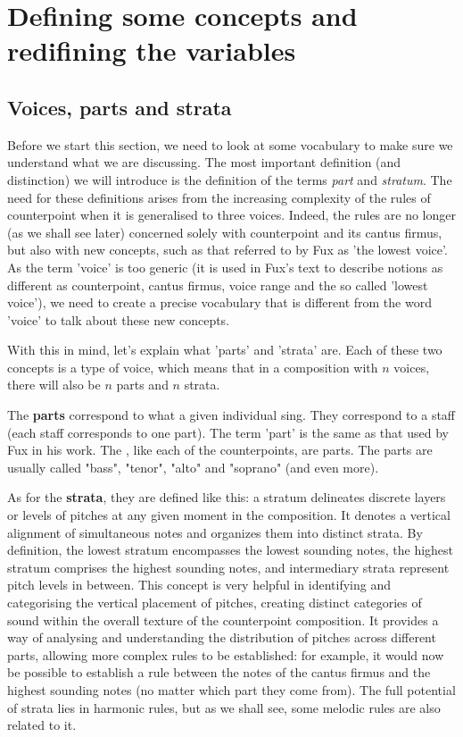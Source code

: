 \chapter{Defining some concepts and redifining the variables} 
\section{Voices, parts and strata}\label{section:parts-and-strata}
Before we start this section, we need to look at some vocabulary to make sure we understand what we are discussing. The most important definition (and distinction) we will introduce is the definition of the terms \textit{part} and \textit{stratum}. The need for these definitions arises from the increasing complexity of the rules of counterpoint when it is generalised to three voices. Indeed, the rules are no longer (as we shall see later) concerned solely with counterpoint and its cantus firmus, but also with new concepts, such as that referred to by Fux as 'the lowest voice'. As the term 'voice' is too generic (it is used in Fux's text to describe notions as different as counterpoint, cantus firmus, voice range and the so called 'lowest voice'), we need to create a precise vocabulary that is different from the word 'voice' to talk about these new concepts. 

With this in mind, let's explain what 'parts' and 'strata' are. Each of these two concepts is a type of voice, which means that in a composition with $n$ voices, there will also be $n$ parts and $n$ strata.

The \textbf{parts} correspond to what a given individual sing. They correspond to a staff (each staff corresponds to one part). The term 'part' is the same as that used by Fux in his work. The \cf, like each of the counterpoints, are parts. The parts are usually called "bass", "tenor", "alto" and "soprano" (and even more).

As for the \textbf{strata}, they are defined like this: a stratum delineates discrete layers or levels of pitches at any given moment in the composition. It denotes a vertical alignment of simultaneous notes and organizes them into distinct strata. By definition, the lowest stratum encompasses the lowest sounding notes, the highest stratum comprises the highest sounding notes, and intermediary strata represent pitch levels in between.
This concept is very helpful in identifying and categorising the vertical placement of pitches, creating distinct categories of sound within the overall texture of the counterpoint composition. It provides a way of analysing and understanding the distribution of pitches across different parts, allowing more complex rules to be established: for example, it would now be possible to establish a rule between the notes of the cantus firmus and the highest sounding notes (no matter which part they come from). The full potential of strata lies in harmonic rules, but as we shall see, some melodic rules are also related to it.

